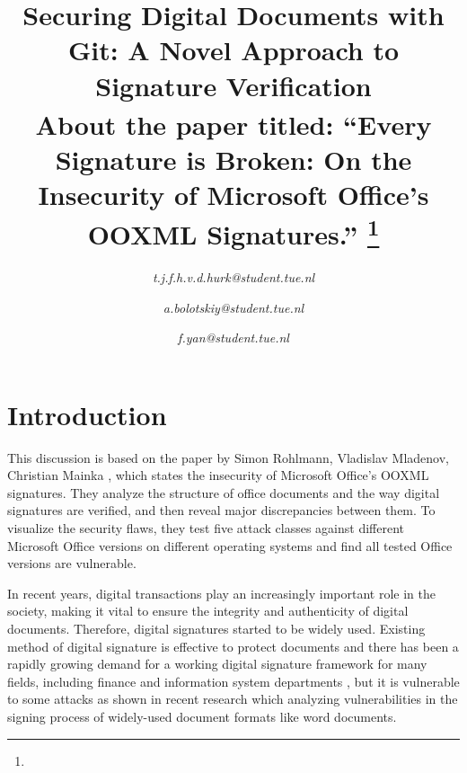 \documentclass[conference]{IEEEtran}
\begin{document}
    \title{Securing Digital Documents with Git: A Novel Approach to Signature Verification\\
    {\footnotesize \textsuperscript{}About the paper titled: “Every Signature is Broken: On the Insecurity of Microsoft Office’s OOXML Signatures.”
    }
    \thanks{}
    }
    \author{
        \textit{t.j.f.h.v.d.hurk@student.tue.nl}
        \and
        \textit{a.bolotskiy@student.tue.nl}
        \and
        \textit{f.yan@student.tue.nl}
    }
    \maketitle
    
    
    \section{Introduction}
        This discussion is based on the paper by Simon Rohlmann, Vladislav Mladenov, Christian Mainka \cite{b1}, which states the insecurity of Microsoft Office’s OOXML signatures. They analyze the structure of office documents and the way digital signatures are verified, and then reveal major discrepancies between them. To visualize the security flaws, they test five attack classes against different Microsoft Office versions on different operating systems and find all tested Office versions are vulnerable.
        
        In recent years, digital transactions play an increasingly important role in the society, making it vital to ensure the integrity and authenticity of digital documents. Therefore, digital signatures started to be widely used. Existing method of digital signature is effective to protect documents and there has been a rapidly growing demand for a working digital signature framework for many fields, including finance and information system departments \cite{b2}, but it is vulnerable to some attacks as shown in recent research \cite{b1} which analyzing vulnerabilities in the signing process of widely-used document formats like word documents.
        
\end{document}
